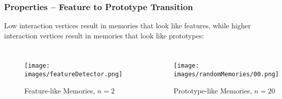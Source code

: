\begin{frame}
    \frametitle{Properties -- Feature to Prototype Transition}

Low interaction vertices result in memories that look like features, while higher interaction vertices result in memories that look like prototypes:

\begin{columns}
    \begin{figure}
        \texttt{[image: images/featureDetector.png]}
    \caption{Feature-like Memories, \(n=2\)}
    \end{figure}
    \pause
    \begin{figure}
    \texttt{[image: images/randomMemories/00.png]}
    \caption{Prototype-like Memories, \(n=20\)}
    \end{figure}
    
\end{columns}

\end{frame}